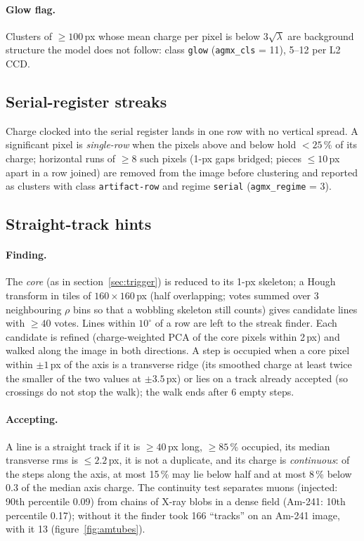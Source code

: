 \documentclass[11pt,a4paper]{article}
\newcommand{\code}[1]{\texttt{#1}}
\begin{document}
\paragraph{Glow flag.} Clusters of $\ge100$\,px whose mean charge per pixel is below $3\sqrt\lambda$ are background structure
the model does not follow: class \code{glow} (\code{agmx\_cls} = 11), 5--12 per L2 CCD.

\subsection{Serial-register streaks}
Charge clocked into the serial register lands in one row with no vertical spread. A significant pixel is \emph{single-row}
when the pixels above and below hold $<25$\,\% of its charge; horizontal runs of $\ge8$ such pixels (1-px gaps bridged; pieces
$\le10$\,px apart in a row joined) are removed from the image before clustering and reported as clusters with class
\code{artifact-row} and regime \code{serial} (\code{agmx\_regime} = 3).

\subsection{Straight-track hints}
\paragraph{Finding.} The \emph{core} (as in section~\ref{sec:trigger}) is reduced to its 1-px skeleton; a Hough transform in
tiles of $160\times160$\,px (half overlapping; votes summed over 3 neighbouring $\rho$ bins so that a wobbling skeleton still
counts) gives candidate lines with $\ge40$ votes. Lines within $10^\circ$ of a row are left to the streak finder. Each
candidate is refined (charge-weighted PCA of the core pixels within 2\,px) and walked along the image in both directions. A step
is occupied when a core pixel within $\pm1$\,px of the axis is a transverse ridge (its smoothed charge at least twice the
smaller of the two values at $\pm3.5$\,px) or lies on a track already accepted (so crossings do not stop the walk); the walk ends
after 6 empty steps.
\paragraph{Accepting.} A line is a straight track if it is $\ge40$\,px long, $\ge85$\,\% occupied, its median transverse rms is
$\le2.2$\,px, it is not a duplicate, and its charge is \emph{continuous}: of the steps along the axis, at most 15\,\% may lie
below half and at most 8\,\% below 0.3 of the median axis charge. The continuity test separates muons (injected: 90th percentile
0.09) from chains of X-ray blobs in a dense field (Am-241: 10th percentile 0.17); without it the finder took 166 ``tracks'' on an
Am-241 image, with it 13 (figure~\ref{fig:amtubes}).
\end{document}
